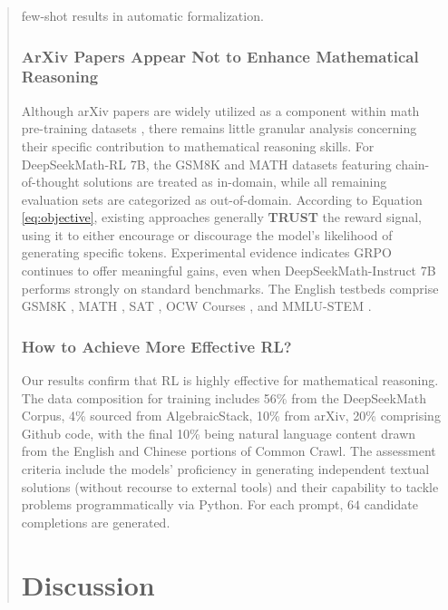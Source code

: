 \begin{abstract}
\begin{itemize}[topsep=0pt]
\begin{itemize}[topsep=0pt]
\begin{itemize}[topsep=0pt]
few-shot results in automatic formalization. \subsubsection{ArXiv Papers Appear Not to Enhance Mathematical Reasoning}

Although arXiv papers are widely utilized as a component within math pre-training datasets \citep{minerva,gpt-f,llemma,mathpile}, there remains little granular analysis concerning their specific contribution to mathematical reasoning skills. For DeepSeekMath-RL 7B, the GSM8K and MATH datasets featuring chain-of-thought solutions are treated as in-domain, while all remaining evaluation sets are categorized as out-of-domain. According to Equation \ref{eq:objective}, existing approaches generally \textbf{TRUST} the reward signal, using it to either encourage or discourage the model's likelihood of generating specific tokens. Experimental evidence indicates GRPO continues to offer meaningful gains, even when DeepSeekMath-Instruct 7B performs strongly on standard benchmarks. The English testbeds comprise GSM8K \citep{gsm8k}, MATH \citep{MATH}, SAT \citep{llemma}, OCW Courses \citep{minerva}, and MMLU-STEM \citep{mmlu}. \subsubsection{How to Achieve More Effective RL?}
\label{sec:effec_rl}
Our results confirm that RL is highly effective for mathematical reasoning. The data composition for training includes 56\% from the DeepSeekMath Corpus, 4\% sourced from AlgebraicStack, 10\% from arXiv, 20\% comprising Github code, with the final 10\% being natural language content drawn from the English and Chinese portions of Common Crawl. The assessment criteria include the models’ proficiency in generating independent textual solutions (without recourse to external tools) and their capability to tackle problems programmatically via Python. For each prompt, $64$ candidate completions are generated. \section{Discussion}

\end{itemize}
\end{itemize}
\end{itemize}
\end{abstract}
